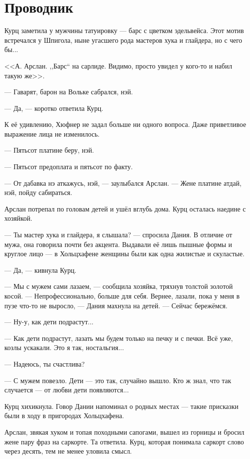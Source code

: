 \section{Проводник}

Курц заметила у мужчины татуировку --- барс с цветком эдельвейса.
Этот мотив встречался у Шпигола, ныне угасшего рода мастеров хука и глайдера, но с чего бы...

<<А.
Арслан.
,,Барс`` на сарлиде.
Видимо, просто увидел у кого-то и набил такую же>>.

--- Гаварят, барон на Вольке сабрался, нэй.

--- Да, --- коротко ответила Курц.

К её удивлению, Хюфнер не задал больше ни одного вопроса.
Даже приветливое выражение лица не изменилось.

--- Пятьсот платине беру, нэй.

--- Пятьсот предоплата и пятьсот по факту.

--- От дабавка нэ аткажусь, нэй, --- заулыбался Арслан.
--- Жене платине атдай, нэй, пойду сабираться.

Арслан потрепал по головам детей и ушёл вглубь дома.
Курц осталась наедине с хозяйкой.

--- Ты мастер хука и глайдера, я слышала? --- спросила Дания.
В отличие от мужа, она говорила почти без акцента.
Выдавали её лишь пышные формы и круглое лицо --- в Хольцхафене женщины были как одна жилистые и скуластые.

--- Да, --- кивнула Курц.

--- Мы с мужем сами лазаем, --- сообщила хозяйка, тряхнув толстой золотой косой.
--- Непрофессионально, больше для себя.
Вернее, лазали, пока у меня в пузе что-то не выросло, --- Дания махнула на детей.
--- Сейчас бережёмся.

--- Ну-у, как дети подрастут...

--- Как дети подрастут, лазать мы будем только на печку и с печки.
Всё уже, козлы ускакали.
Это я так, ностальгия...

--- Надеюсь, ты счастлива?

--- С мужем повезло.
Дети --- это так, случайно вышло.
Кто ж знал, что так случается --- от любви дети появляются...

Курц хихикнула.
Говор Дании напоминал о родных местах --- такие присказки были в ходу в пригородах Хольцхафена.

Арслан, звякая хуком и топая походными сапогами, вышел из горницы и бросил жене пару фраз на саркорте.
Та ответила.
Курц, которая понимала саркорт слово через десять, тем не менее уловила смысл.


